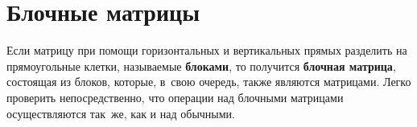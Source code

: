 \section{Блочные матрицы}
 Если матрицу при помощи горизонтальных и вертикальных прямых разделить на прямоугольные клетки, называемые \textbf{блоками}, то получится \textbf{блочная матрица}, состоящая из блоков, которые, в~свою очередь, также являются матрицами.
Легко проверить непосредственно, что операции над блочными матрицами осуществляются так~же, как и над обычными.